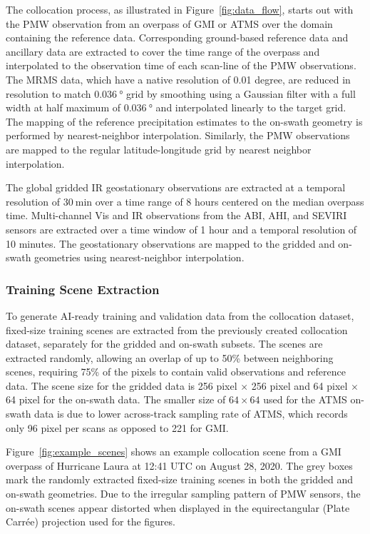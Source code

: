 \documentclass[11pt]{article}
\begin{document}
The collocation process, as illustrated in Figure~\ref{fig:data_flow}, starts
out with the PMW observation from an overpass of GMI or ATMS over the domain
containing the reference data. Corresponding ground-based reference data and
ancillary data are extracted to cover the time range of the overpass and
interpolated to the observation time of each scan-line of the PMW observations.
The MRMS data, which have a native resolution of 0.01 degree, are reduced in
resolution to match $\SI{0.036}{\degree}$ grid by smoothing using a Gaussian filter with
a full width at half maximum of $\SI{0.036}{\degree}$ and interpolated linearly to the
target grid. The mapping of the reference precipitation estimates to the
on-swath geometry is performed by nearest-neighbor interpolation. Similarly, the
PMW observations are mapped to the regular latitude-longitude grid by nearest
neighbor interpolation.

The global gridded IR geostationary observations are extracted at a temporal
resolution of $\SI{30}{\minute}$ over a time range of 8 hours centered on the
median overpass time. Multi-channel Vis and IR observations from the ABI, AHI,
and SEVIRI sensors are extracted over a time window of 1 hour and a temporal
resolution of 10 minutes. The geostationary observations are mapped to the
gridded and on-swath geometries using nearest-neighbor interpolation.

\subsubsection{Training Scene Extraction}

To generate AI-ready training and validation data from the collocation dataset,
fixed-size training scenes are extracted from the previously created collocation
dataset, separately for the gridded and on-swath subsets. The scenes are
extracted randomly, allowing an overlap of up to 50\% between neighboring
scenes, requiring 75\% of the pixels to contain valid observations and reference
data. The scene size for the gridded data is 256 pixel $\times$ 256 pixel and 64
pixel $\times$ 64 pixel for the on-swath data. The smaller size of $64 \times
	64$ used for the ATMS on-swath data is due to lower across-track sampling rate
of ATMS, which records only 96 pixel per scans as opposed to 221 for GMI.

Figure~\ref{fig:example_scenes} shows an example collocation scene from a GMI
overpass of Hurricane Laura at 12:41 UTC on August 28, 2020. The grey boxes mark
the randomly extracted fixed-size training scenes in both the gridded and
on-swath geometries. Due to the irregular sampling pattern of PMW sensors, the
on-swath scenes appear distorted when displayed in the equirectangular (Plate
Carrée) projection used for the figures.
\end{document}
